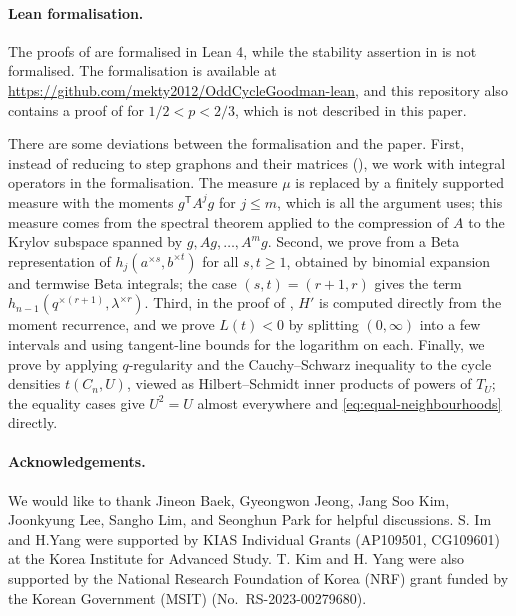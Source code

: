 \documentclass[11pt]{article}
\theoremstyle{remark}
\numberwithin{equation}{section}
\newcommand{\tC}[2]{t(C_{#1},#2)}
\newcommand{\Tker}[1]{T_{#1}}
\begin{document}
\paragraph{Lean formalisation.}
The proofs of  are formalised in Lean 4, while the stability assertion in  is not formalised.
The formalisation is available at \url{https://github.com/mekty2012/OddCycleGoodman-lean}, and this repository also contains a proof of  for $1/2<p<2/3$, which is not described in this paper.

There are some deviations between the formalisation and the paper.
First, instead of reducing to step graphons and their matrices (), we work with integral operators in the formalisation.
The measure $\mu$ is replaced by a finitely supported measure with the moments $g^{\mathsf T}A^jg$ for $j\le m$, which is all the argument uses; this measure comes from the spectral theorem applied to the compression of $A$ to the Krylov subspace spanned by $g,Ag,\ldots,A^mg$.
Second, we prove  from a Beta representation of $h_j(a^{\times s},b^{\times t})$ for all $s,t\ge1$, obtained by binomial expansion and termwise Beta integrals; the case $(s,t)=(r+1,r)$ gives the term $h_{n-1}(q^{\times(r+1)},\lambda^{\times r})$.
Third, in the proof of , $H'$ is computed directly from the moment recurrence, and we prove $L(t)<0$ by splitting $(0,\infty)$ into a few intervals and using tangent-line bounds for the logarithm on each.
Finally, we prove  by applying $q$-regularity and the Cauchy--Schwarz inequality to the cycle densities $\tC nU$, viewed as Hilbert--Schmidt inner products of powers of $\Tker U$; the equality cases give $U^2=U$ almost everywhere and \eqref{eq:equal-neighbourhoods} directly.



\paragraph{Acknowledgements.}
We would like to thank Jineon Baek, Gyeongwon Jeong, Jang Soo Kim, Joonkyung Lee,
Sangho Lim, and Seonghun Park for helpful discussions.
S. Im and H.Yang were supported by KIAS Individual Grants (AP109501, CG109601) 
at the Korea Institute for Advanced Study. T. Kim and H. Yang were also
supported by the National Research Foundation of Korea (NRF)
grant funded by the Korean Government (MSIT) (No.~RS-2023-00279680).
\end{document}
